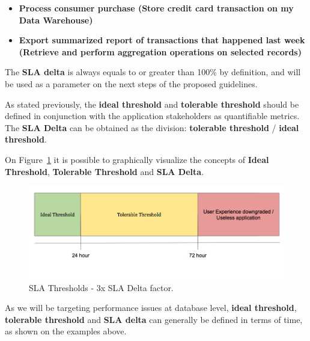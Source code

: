 \begin{itemize}
\item{ 
\textbf{Process consumer purchase (Store credit card transaction on my Data Warehouse)}
}

\item{
\textbf{Export summarized report of transactions that happened last week (Retrieve and perform aggregation operations on selected records) }
}

\end{itemize}

The \textbf{SLA delta} is always equals to or greater than 100\% by definition, and will be used as a parameter on the next steps of the proposed guidelines.

As stated previously, the \textbf{ideal threshold} and \textbf{tolerable threshold} should be defined in conjunction with the application stakeholders as quantifiable metrics. The \textbf{SLA Delta} can be obtained as the division: \textbf{tolerable threshold} / \textbf{ideal threshold}.

On Figure~\ref{fig:thresholds} it is possible to graphically visualize the concepts of \textbf{Ideal Threshold}, \textbf{Tolerable Threshold} and \textbf{SLA Delta}.

\begin{figure}[ht!]
\centering
\includegraphics[width=120mm]{Imagens/thresholds.png}
\caption{SLA Thresholds - 3x SLA Delta factor. \label{fig:thresholds}}
\end{figure}

As we will be targeting performance issues at database level, \textbf{ideal threshold}, \textbf{tolerable threshold} and \textbf{SLA delta} can generally be defined in terms of time, as shown on the examples above. 

